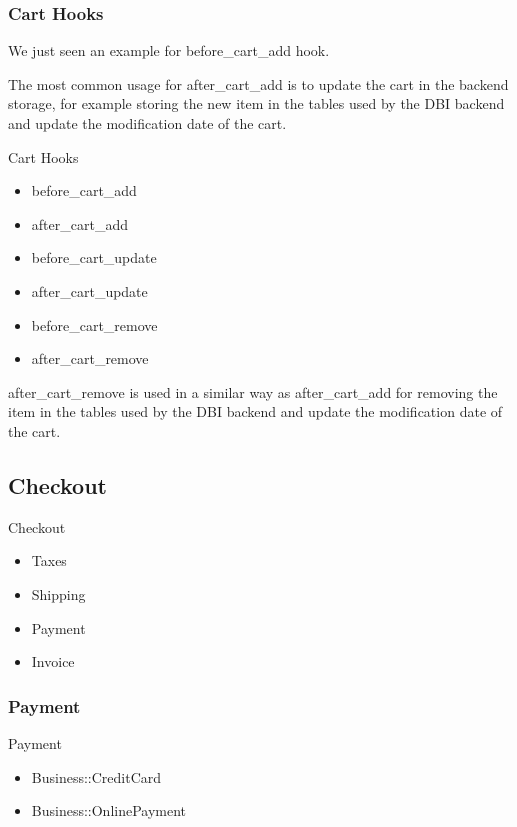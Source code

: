 \subsubsection{Cart Hooks}
We just seen an example for before_cart_add hook.

The most common usage for after_cart_add is to update the cart
in the backend storage, for example storing the new item in the tables 
used by the DBI backend and update the modification date of the cart.

\begin{frame}{Cart Hooks}
\begin{itemize}
\item before\_cart\_add
\item after\_cart\_add
\item before\_cart\_update
\item after\_cart\_update
\item before\_cart\_remove
\item after\_cart\_remove
\end{itemize}
\end{frame}

after_cart_remove is used in a similar way as after_cart_add 
for removing the item in the tables used by the DBI backend
and update the modification date of the cart.

\subsection{Checkout}

\begin{frame}{Checkout}
\begin{itemize}
\item Taxes
\item Shipping
\item Payment
\item Invoice
\end{itemize}
\end{frame}

\subsubsection{Payment}
\begin{frame}{Payment}
\begin{itemize}
\item Business::CreditCard
\item Business::OnlinePayment
\end{itemize}
\end{frame}

